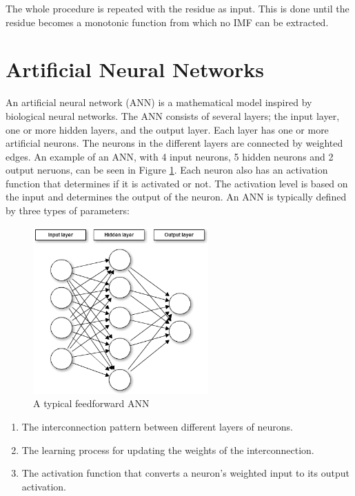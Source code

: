 \documentclass[12pt]{article}
\begin{document}
The whole procedure is repeated with the residue as input. This is done until the residue becomes a monotonic function from which no IMF can be extracted. 


\section{Artificial Neural Networks}
\label{ann}
An artificial neural network (ANN) is a mathematical model inspired by biological neural networks. The ANN consists of several layers; the input layer, one or more hidden layers, and the output layer. Each layer has one or more artificial neurons. The neurons in the different layers are connected by weighted edges. An example of an ANN, with 4 input neurons, 5 hidden neurons and 2 output neruons, can be seen in Figure \ref{fig:ann}. Each neuron also has an activation function that determines if it is activated or not. The activation level is based on the input and determines the output of the neuron. An ANN is typically defined by three types of parameters:

\begin{figure}[h]
\centering
\includegraphics[width = 0.6\textwidth]{ann}
\caption{A typical feedforward ANN}
\label{fig:ann}
\end{figure}

\begin{enumerate}
\item The interconnection pattern between different layers of neurons.
\item The learning process for updating the weights of the interconnection.
\item The activation function that converts a neuron's weighted input to its output activation.
\end{enumerate}
\end{document}
